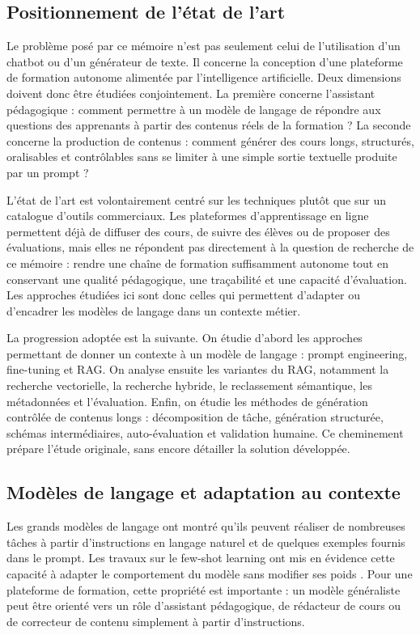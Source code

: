 \documentclass[12pt,a4paper]{article}
\begin{document}
\subsection{Positionnement de l'état de l'art}

Le problème posé par ce mémoire n'est pas seulement celui de l'utilisation d'un chatbot
ou d'un générateur de texte. Il concerne la conception d'une plateforme de formation
autonome alimentée par l'intelligence artificielle. Deux dimensions doivent donc être
étudiées conjointement. La première concerne l'assistant pédagogique : comment permettre
à un modèle de langage de répondre aux questions des apprenants à partir des contenus
réels de la formation ? La seconde concerne la production de contenus : comment générer
des cours longs, structurés, oralisables et contrôlables sans se limiter à une simple sortie
textuelle produite par un prompt ?

L'état de l'art est volontairement centré sur les techniques plutôt que sur un catalogue
d'outils commerciaux. Les plateformes d'apprentissage en ligne permettent déjà de
diffuser des cours, de suivre des élèves ou de proposer des évaluations, mais elles ne
répondent pas directement à la question de recherche de ce mémoire : rendre une chaîne
de formation suffisamment autonome tout en conservant une qualité pédagogique, une
traçabilité et une capacité d'évaluation. Les approches étudiées ici sont donc celles qui
permettent d'adapter ou d'encadrer les modèles de langage dans un contexte métier.

La progression adoptée est la suivante. On étudie d'abord les approches permettant de
donner un contexte à un modèle de langage : prompt engineering, fine-tuning et RAG. On
analyse ensuite les variantes du RAG, notamment la recherche vectorielle, la recherche
hybride, le reclassement sémantique, les métadonnées et l'évaluation. Enfin, on étudie
les méthodes de génération contrôlée de contenus longs : décomposition de tâche,
génération structurée, schémas intermédiaires, auto-évaluation et validation humaine. Ce
cheminement prépare l'étude originale, sans encore détailler la solution développée.

\subsection{Modèles de langage et adaptation au contexte}

Les grands modèles de langage ont montré qu'ils peuvent réaliser de nombreuses tâches
à partir d'instructions en langage naturel et de quelques exemples fournis dans le
prompt. Les travaux sur le few-shot learning ont mis en évidence cette capacité à adapter
le comportement du modèle sans modifier ses poids \cite{brown2020language}. Pour une
plateforme de formation, cette propriété est importante : un modèle généraliste peut être
orienté vers un rôle d'assistant pédagogique, de rédacteur de cours ou de correcteur de
contenu simplement à partir d'instructions.
\end{document}
